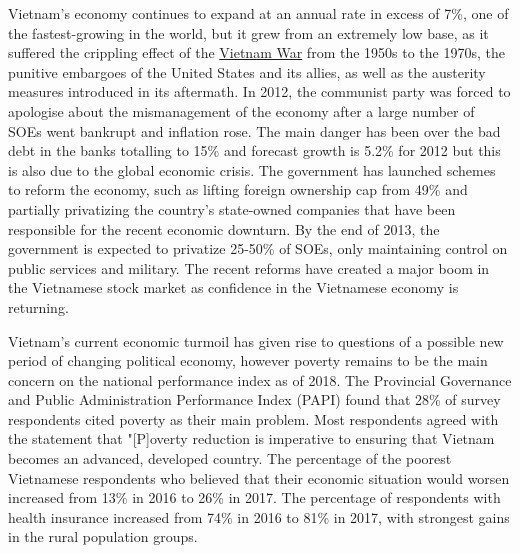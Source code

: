 \documentclass[openany]{book}
\begin{document}
Vietnam's economy continues to expand at an annual rate in excess of 7\%, one of the fastest-growing in the world, but it grew from an extremely low base, as it suffered the crippling effect of the \href{https://en.wikipedia.org/wiki/Vietnam_War}{Vietnam War} from the 1950s to the 1970s, the punitive embargoes of the United States and its allies, as well as the austerity measures introduced in its aftermath.\cite{36} In 2012, the communist party was forced to apologise about the mismanagement of the economy after a large number of SOEs went bankrupt and inflation rose. The main danger has been over the bad debt in the banks totalling to 15\% and forecast growth is 5.2\% for 2012 but this is also due to the global economic crisis.\cite{54} The government has launched schemes to reform the economy, such as lifting foreign ownership cap from 49\% and partially privatizing the country's state-owned companies that have been responsible for the recent economic downturn. By the end of 2013, the government is expected to privatize 25-50\% of SOEs, only maintaining control on public services and military. The recent reforms have created a major boom in the Vietnamese stock market as confidence in the Vietnamese economy is returning.

Vietnam's current economic turmoil has given rise to questions of a possible new period of changing political economy, however\cite{55} poverty remains to be the main concern on the national performance index as of 2018. The Provincial Governance and Public Administration Performance Index (PAPI) found that 28\% of survey respondents cited poverty as their main problem.\cite{56} Most respondents agreed with the statement that "[P]overty reduction is imperative to ensuring that Vietnam becomes an advanced, developed country. The percentage of the poorest Vietnamese respondents who believed that their economic situation would worsen increased from 13\% in 2016 to 26\% in 2017.\cite{56} The percentage of respondents with health insurance increased from 74\% in 2016 to 81\% in 2017, with strongest gains in the rural population groups.\cite{56}
\end{document}
